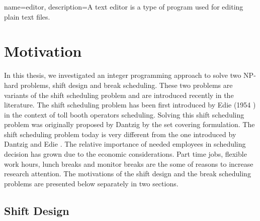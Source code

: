 %
%
%
%



{
  name={editor},
  description={A text editor is a type of program used for editing plain text files.}
}


\section{Motivation}

In this thesis, we investigated an integer programming approach to solve two NP-hard problems, shift design and break scheduling. These two problems are variants of the shift scheduling problem and are introduced recently in the literature. The shift scheduling problem has been first introduced by Edie (1954 )\cite{li:1954:edie} in the context of toll booth operators scheduling. Solving this shift scheduling problem was originally proposed by Dantzig \cite{li:1954:dantzig} by the set covering formulation. The shift scheduling problem today is very different from the one introduced by Dantzig \cite{li:1954:dantzig} and Edie \cite{li:1954:edie}. The relative importance of needed employees in scheduling decision has grown due to the economic considerations. Part time jobs, flexible work hours, lunch breaks and monitor breaks are the some of reasons to increase research attention. The motivations of the shift design and the break scheduling problems are presented below separately in two sections.

\subsection{Shift Design}

